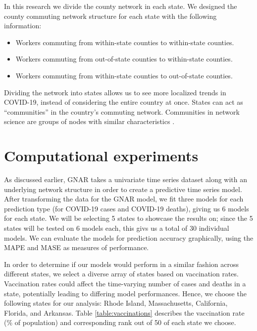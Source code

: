 In this research we divide the county network in each state.
We designed the county commuting network structure for each state with the following information:
\begin{itemize}
    \item Workers commuting from within-state counties to within-state counties.
    \item Workers commuting from out-of-state counties to within-state counties.
    \item Workers commuting from within-state counties to out-of-state counties.
\end{itemize}
Dividing the network into states allows us to see more localized trends in {COVID-19}, instead of considering the entire country at once. States can act as ``communities'' in the country's commuting network. Communities in network science are groups of nodes with similar characteristics \cite{newmanbarabasi}.

\section{Computational experiments}
\label{sec:results}

As discussed earlier, GNAR takes a univariate time series dataset along with an underlying network structure in order to create a predictive time series model. After transforming the data for the {GNAR} model, we fit three models for each prediction type (for COVID-19 cases and COVID-19 deaths), giving us 6 models for each state. We will be selecting 5 states to showcase the results on; since the 5 states will be tested on 6 models each, this givs us a total of 30 individual models. We can evaluate the models for prediction accuracy graphically, using the {MAPE} and {MASE} as measures of performance.

In order to determine if our models would perform in a similar fashion across different states, we select a diverse array of states based on vaccination rates. Vaccination rates could affect the time-varying number of cases and deaths in a state, potentially leading to differing model performances. Hence, we choose the following states for our analysis: Rhode Island, Massachusetts, California, Florida, and Arkansas. Table \ref{table:vaccinations} describes the vaccination rate (\% of population) and corresponding rank out of 50 of each state we choose.

